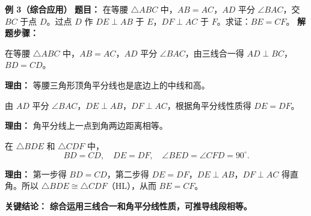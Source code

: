 \begin{examplebox}
	\medskip
	\textbf{\textcolor{CExample}{例 3（综合应用）}}
	\textbf{\textcolor{CExample}{题目：}}
	在等腰 $\triangle ABC$ 中，$AB=AC$，$AD$ 平分 $\angle BAC$，交 $BC$ 于点 $D$。过点 $D$ 作 $DE\perp AB$ 于 $E$，$DF\perp AC$ 于 $F$。求证：$BE=CF$。
	\textbf{\textcolor{CExample}{解题步骤：}}
	\begin{description}[style=nextline, leftmargin=2.8em, labelsep=0.5em, itemsep=0.45em]
		\item[\textbf{第一步（三线合一）：}]
			在等腰 $\triangle ABC$ 中，$AB=AC$，$AD$ 平分 $\angle BAC$，由三线合一得 $AD\perp BC$，$BD=CD$。
			\par\textbf{理由：} 等腰三角形顶角平分线也是底边上的中线和高。
		\item[\textbf{第二步（垂两边得等距）：}]
			由 $AD$ 平分 $\angle BAC$，$DE\perp AB$，$DF\perp AC$，根据角平分线性质得 $DE=DF$。
			\par\textbf{理由：} 角平分线上一点到角两边距离相等。
		\item[\textbf{第三步（证全等得边等）：}]
			在 $\triangle BDE$ 和 $\triangle CDF$ 中，
			\[
				BD = CD,\quad DE = DF,\quad \angle BED = \angle CFD = 90^\circ.
			\]
			\par\textbf{理由：} 第一步得 $BD=CD$，第二步得 $DE=DF$，$DE\perp AB$，$DF\perp AC$ 得直角。所以 $\triangle BDE \cong \triangle CDF$（HL），从而 $BE=CF$。
	\end{description}
	\textbf{\textcolor{CExample}{关键结论：}}
	\textbf{综合运用三线合一和角平分线性质，可推导线段相等。}
\end{examplebox}

